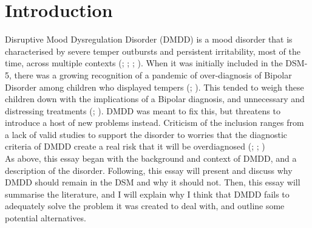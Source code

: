 \documentclass[stu,a4paper,12pt,donotrepeattitle]{apa7}
\begin{document}
\section{Introduction}
Disruptive Mood Dysregulation Disorder (DMDD) is a mood disorder that is
characterised by severe temper outbursts and
persistent irritability, most of the time, across multiple contexts
(\cite{apa13}; \cite{baweja16}; \cite{franc13}; \cite{lochman15}).
When it was initially included in the DSM-5, there was a growing recognition
of a pandemic of over-diagnosis of Bipolar Disorder among children who
displayed tempers (\cite{baweja16}; \cite{lochman15}). This tended to weigh
these children down with the implications of a Bipolar diagnosis, and
unnecessary and distressing treatments (\cite{franc13}; \cite{lochman15}).
DMDD was meant to fix this, but threatens to introduce a host of new problems
instead. Criticism of the inclusion ranges from a lack of valid studies to
support the disorder to worries that the diagnostic criteria of DMDD create
a real risk that it will be overdiagnosed (\cite{baweja16}; \cite{franc13};
\cite{lochman15})\\
As above, this essay began with the background and context of DMDD, and a
description of the disorder. Following, this essay will present and discuss why
DMDD should remain in the DSM and why it should not. Then, this essay will
summarise the literature, and I will explain why I think that DMDD fails to
adequately solve the problem it was created to deal with, and outline some
potential alternatives.\\
\end{document}
